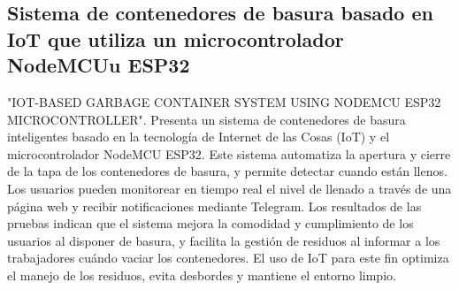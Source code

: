 \subsection{Sistema de contenedores de basura basado en IoT que utiliza un microcontrolador NodeMCUu ESP32}
"IOT-BASED GARBAGE CONTAINER SYSTEM USING NODEMCU ESP32 MICROCONTROLLER". Presenta un sistema de contenedores de basura inteligentes basado en la tecnología de Internet de las Cosas (IoT) y el microcontrolador NodeMCU ESP32. Este sistema automatiza la apertura y cierre de la tapa de los contenedores de basura, y permite detectar cuando están llenos. Los usuarios pueden monitorear en tiempo real el nivel de llenado a través de una página web y recibir notificaciones mediante Telegram. Los resultados de las pruebas indican que el sistema mejora la comodidad y cumplimiento de los usuarios al disponer de basura, y facilita la gestión de residuos al informar a los trabajadores cuándo vaciar los contenedores. El uso de IoT para este fin optimiza el manejo de los residuos, evita desbordes y mantiene el entorno limpio.~\cite{anggrawan}